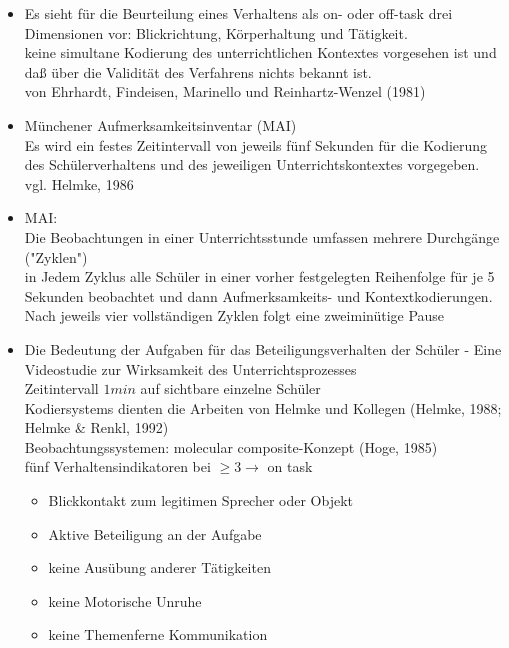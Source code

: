\begin{itemize}
	\item Es sieht für die Beurteilung eines Verhaltens als on- oder off-task drei Dimensionen vor: Blickrichtung, Körperhaltung und Tätigkeit.\\
	keine simultane Kodierung des unterrichtlichen Kontextes vorgesehen ist und daß über die Validität des Verfahrens nichts bekannt ist.\\
	von Ehrhardt, Findeisen, Marinello und Reinhartz-Wenzel (1981)
	\item Münchener Aufmerksamkeitsinventar (MAI)\\
	Es wird ein festes Zeitintervall von jeweils fünf Sekunden für die Kodierung des Schülerverhaltens und des jeweiligen Unterrichtskontextes
	vorgegeben.\\
	vgl. Helmke, 1986
	\item MAI:\\
	Die Beobachtungen in einer Unterrichtsstunde umfassen mehrere Durchgänge ("Zyklen")\\
	in Jedem Zyklus alle Schüler in einer vorher festgelegten Reihenfolge für je 5 Sekunden beobachtet und dann Aufmerksamkeits- und Kontextkodierungen.\\
	Nach jeweils vier vollständigen Zyklen folgt eine zweiminütige Pause
	\item Die Bedeutung der Aufgaben für das Beteiligungsverhalten der Schüler - Eine Videostudie zur Wirksamkeit des Unterrichtsprozesses\\ Zeitintervall $1min$ auf sichtbare einzelne Schüler\\
	Kodiersystems dienten die Arbeiten von Helmke und Kollegen 
	(Helmke, 1988; Helmke \& Renkl, 1992)\\
	Beobachtungssystemen: molecular composite-Konzept (Hoge, 1985)\\
	fünf Verhaltensindikatoren bei $\ge 3 \rightarrow $ on task
	\begin{itemize}
		\item Blickkontakt zum legitimen Sprecher oder Objekt
		\item Aktive Beteiligung an der Aufgabe
		\item keine Ausübung anderer Tätigkeiten
		\item keine Motorische Unruhe
		\item keine Themenferne Kommunikation
	\end{itemize}
\end{itemize}
